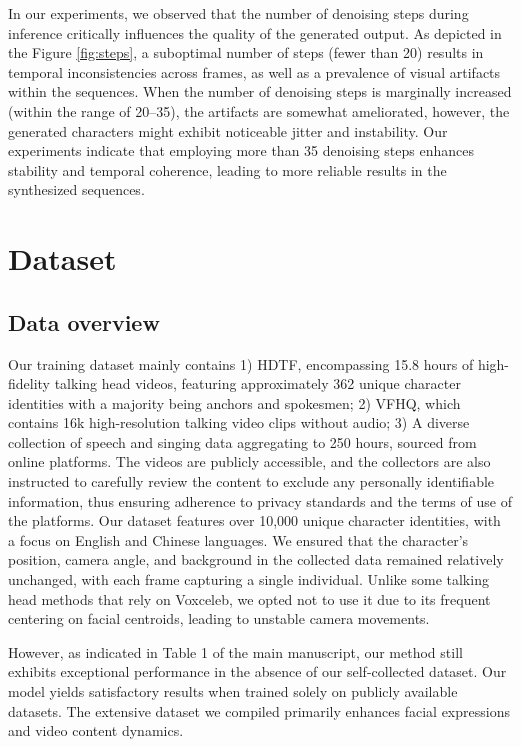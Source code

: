 \documentclass[runningheads]{llncs}
\begin{document}
In our experiments, we observed that the number of denoising steps during inference critically influences the quality of the generated output. As depicted in the Figure \ref{fig:steps}, a suboptimal number of steps (fewer than 20) results in temporal inconsistencies across frames, as well as a prevalence of visual artifacts within the sequences. When the number of denoising steps is marginally increased (within the range of 20–35), the artifacts are somewhat ameliorated, however, the generated characters might exhibit noticeable jitter and instability. Our experiments indicate that employing more than 35 denoising steps enhances stability and temporal coherence, leading to more reliable results in the synthesized sequences.

\section{Dataset}

\subsection{Data overview}

Our training dataset mainly contains 1) HDTF\cite{hdtf}, encompassing 15.8 hours of high-fidelity talking head videos, featuring approximately 362 unique character identities with a majority being anchors and spokesmen; 2) VFHQ\cite{vfhq}, which contains 16k high-resolution talking video clips without audio; 3) A diverse collection of speech and singing data aggregating to 250 hours, sourced from online platforms. 
The videos are publicly accessible, and the collectors are also instructed to carefully review the content to exclude any personally identifiable information, thus ensuring adherence to privacy standards and the terms of use of the platforms. 
Our dataset features over 10,000 unique character identities, with a focus on English and Chinese languages. We ensured that the character's position, camera angle, and background in the collected data remained relatively unchanged, with each frame capturing a single individual. Unlike some talking head methods that rely on Voxceleb\cite{Voxceleb,sun2023vividtalk, dreamtalk}, we opted not to use it due to its frequent centering on facial centroids, leading to unstable camera movements. 

However, as indicated in Table 1 of the main manuscript, our method still exhibits exceptional performance in the absence of our self-collected dataset. Our model yields satisfactory results when trained solely on publicly available datasets. The extensive dataset we compiled primarily enhances facial expressions and video content dynamics.
\end{document}
